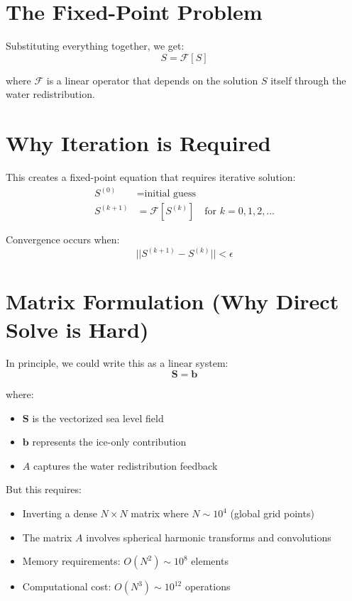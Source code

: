 \documentclass{article}
\begin{document}
\section{The Fixed-Point Problem}

Substituting everything together, we get:
\begin{equation}
S = \mathcal{F}[S]
\end{equation}

where $\mathcal{F}$ is a linear operator that depends on the solution $S$ itself through the water redistribution.

\section{Why Iteration is Required}

This creates a fixed-point equation that requires iterative solution:
\begin{align}
S^{(0)} &= \text{initial guess} \\
S^{(k+1)} &= \mathcal{F}[S^{(k)}] \quad \text{for } k = 0, 1, 2, \ldots
\end{align}

Convergence occurs when:
\begin{equation}
||S^{(k+1)} - S^{(k)}|| < \epsilon
\end{equation}

\section{Matrix Formulation (Why Direct Solve is Hard)}

In principle, we could write this as a linear system:
\begin{equation}
[I - A] \mathbf{S} = \mathbf{b}
\end{equation}

where:
\begin{itemize}
\item $\mathbf{S}$ is the vectorized sea level field
\item $\mathbf{b}$ represents the ice-only contribution
\item $A$ captures the water redistribution feedback
\end{itemize}

But this requires:
\begin{itemize}
\item Inverting a dense $N \times N$ matrix where $N \sim 10^4$ (global grid points)
\item The matrix $A$ involves spherical harmonic transforms and convolutions
\item Memory requirements: $O(N^2) \sim 10^8$ elements
\item Computational cost: $O(N^3) \sim 10^{12}$ operations
\end{itemize}
\end{document}

